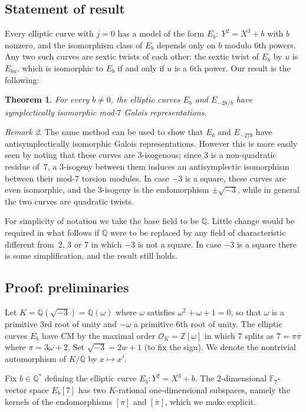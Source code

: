 \documentclass[12pt]{amsart}
\newcommand{\F}{\mathbb{F}}
\newcommand{\Q}{\mathbb{Q}}
\newcommand{\Z}{\mathbb{Z}}
\newcommand{\OO}{\mathscr{O}}
\def\w{\omega}
\def\r3{\sqrt{-3}}
\def\pibar{\overline{\pi}}
\numberwithin{equation}{section}
\newtheorem{theorem}{Theorem}[section]
\theoremstyle{definition}
\theoremstyle{remark}
\newtheorem{remark}[theorem]{Remark}
\begin{document}
\subsection{Statement of result}
Every elliptic curve with $j=0$ has a model of the form
$E_b:\ Y^2=X^3+b$ with $b$ nonzero, and the isomorphism class of $E_b$
depends only on $b$ modulo $6$th powers.  Any two such curves are
sextic twists of each other: the sextic twist of $E_b$ by $u$ is
$E_{bu}$, which is isomorphic to $E_b$ if and only if $u$ is a $6$th
power.  Our result is the following:

\begin{theorem}\label{T:j=0}
For every $b\not=0$, the elliptic curves $E_b$ and $E_{-28/b}$ have
symplectically isomorphic mod-$7$ Galois representations.
\end{theorem}

\begin{remark}
The same method can be used to show that $E_b$ and $E_{-27b}$ have
antisymplectically isomorphic Galois representations.  However this is
more easily seen by noting that these curves are $3$-isogenous; since
$3$ is a non-quadratic residue of~$7$, a $3$-isogeny between them
induces an antisymplectic isomorphism between their mod-$7$ torsion
modules.  In case $-3$ is a square, these curves are even isomorphic,
and the $3$-isogeny is the endomorphism $\pm\r3$, while in
general the two curves are quadratic twists.
\end{remark}

For simplicity of notation we take the base field to be $\Q$.  Little
change would be required in what follows if $\Q$ were to be replaced
by any field of characteristic different from~$2$, $3$ or $7$ in which
$-3$ is not a square.  In case $-3$ is a square there is some
simplification, and the result still holds.

\subsection{Proof: preliminaries}
Let $K=\Q(\r3)=\Q(\w)$ where $\w$ satisfies
$\w^2+\w+1=0$, so that $\w$ is a primitive $3$rd root of
unity and $-\w$ a primitive $6$th root of unity.  The elliptic
curves $E_b$ have CM by the maximal order $\OO_K=\Z[\w]$ in which
$7$ splits as $7=\pi\pibar$ where $\pi=3\w+2$.  Set
$\r3=2w+1$ (to fix the sign).  We denote the nontrivial
automorphism of $K/\Q$ by $x\mapsto x'$.

Fix $b\in\Q^*$ defining the elliptic curve $E_b: Y^2=X^3+b$.  The
$2$-dimensional $\F_7$-vector space $E_b[7]$ has two $K$-rational
one-dimensional subspaces, namely the kernels of the endomorphisms
$[\pi]$ and $[\pibar]$, which we make explicit.
\end{document}
